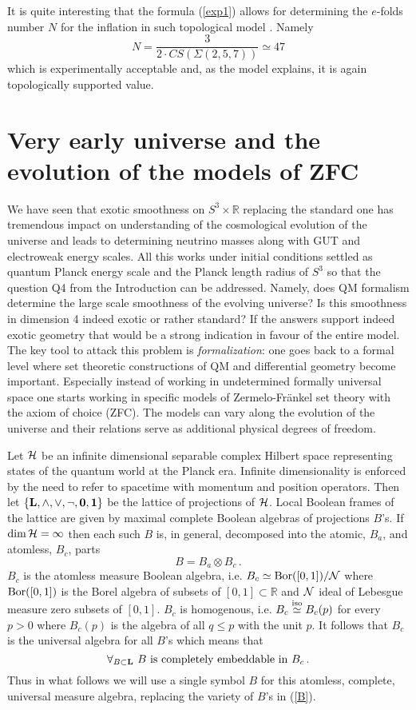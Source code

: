 \documentclass[12pt]{article}
\begin{document}
It is quite interesting that the formula (\ref{exp1}) allows for determining the $e$-folds number $N$ for the inflation in such topological model \cite{AK2014,AK2019}. Namely
\[N=\frac{3}{2\cdot CS(\Sigma(2,5,7))}\simeq 47 \] which is experimentally acceptable and, as the model explains, it is again topologically supported value.
\section{Very early universe and the evolution of the models of ZFC}
We have seen that exotic smoothness on $S^3\times \mathbb{R}$ replacing the standard one has tremendous impact on understanding of the cosmological evolution of the universe and leads to determining neutrino masses along with GUT and electroweak energy scales. All this works under initial conditions settled as quantum Planck energy scale and the Planck length radius of $S^3$ so that the question Q4 from the Introduction can be addressed. Namely, does QM formalism determine the large scale smoothness of the evolving universe? Is this smoothness in dimension 4 indeed exotic or rather standard? If the answers support indeed exotic geometry that would be a strong indication in favour of the entire model. The key tool to attack this problem is {\em formalization}: one goes back to a formal level where set theoretic constructions of QM and differential geometry become important. Especially instead of working in undetermined formally universal space one starts working in specific models of Zermelo-Fr\"ankel set theory with the axiom of choice (ZFC). The models can vary along the evolution of the universe and their relations serve as additional physical degrees of freedom. 

Let ${\cal H}$ be an infinite dimensional separable complex Hilbert space representing states of the quantum world at the Planck era. Infinite dimensionality is enforced by the need to refer to spacetime with momentum and position operators. Then let $\{\bf{L},\wedge,\vee,\neg, 0,1\}$ be the lattice of projections of ${\cal H}$. Local Boolean frames of the lattice are given by maximal complete Boolean algebras of projections $B$'s. If $\dim {\cal H}=\infty $ then each such $B$ is, in general, decomposed into the atomic, $B_a$, and atomless, $B_c$, parts \cite{Kappos1969}
\begin{equation}\label{B} B=B_a \otimes B_c\,. \end{equation}
$B_c$ is the atomless measure Boolean algebra, i.e. $B_c\simeq {\rm Bor}([0,1])/{\cal N}$ where ${\rm Bor}([0,1])$ is the Borel algebra of subsets of $[0,1]\subset \mathbb{R}$ and ${\cal N}$ ideal of Lebesgue measure zero subsets of $[0,1]$. $B_c$ is homogenous, i.e. $B_c \overset{\rm iso}{\simeq} B_c(p)$ for every $p>0$ where $B_c(p)$ is the algebra of all $q\leq p$ with the unit $p$. It follows that $B_c$ is the universal algebra for all $B$'s which means that 
\[ \forall_{B\subset {\bf L}}\ B{\text{ is completely embeddable in }} B_c \,.\]
Thus in what follows we will use a single symbol $B$ for this atomless, complete, universal measure algebra, replacing the variety of $B$'s in (\ref{B}). 
\end{document}
